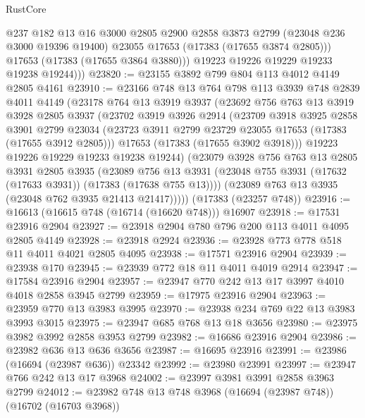 \begin{lexlean}{RustCore}
\begin{coremodule}
              @237
              @182
              @13
              @16
              @3000
              @2805
              @2900
              @2858
              @3873
              @2799
              (@23048 @236 @3000 @19396 @19400)
              @23055
              @17653
              (@17383 (@17655 @3874 @2805)))
            @17653
            (@17383 (@17655 @3864 @3880)))
          @19223
          @19226
          @19229
          @19233
          @19238
          @19244)))
@23820 := @23155 @3892 @799 @804 @113 @4012 @4149 @2805 @4161
@23910 := @23166
    @748
    @13
    @764
    @798
    @113
    @3939
    @748
    @2839
    @4011
    @4149
    (@23178
      @764
      @13
      @3919
      @3937
      (@23692
        @756
        @763
        @13
        @3919
        @3928
        @2805
        @3937
        (@23702
          @3919
          @3926
          @2914
          (@23709
            @3918
            @3925
            @2858
            @3901
            @2799
            @23034
            (@23723 @3911 @2799 @23729 @23055 @17653 (@17383 (@17655 @3912 @2805)))
            @17653
            (@17383 (@17655 @3902 @3918)))
          @19223
          @19226
          @19229
          @19233
          @19238
          @19244)
        (@23079
          @3928
          @756
          @763
          @13
          @2805
          @3931
          @2805
          @3935
          (@23089
            @756
            @13
            @3931
            (@23048 @755 @3931 (@17632 (@17633 @3931)) (@17383 (@17638 @755 @13))))
          (@23089 @763 @13 @3935 (@23048 @762 @3935 @21413 @21417)))))
    (@17383 (@23257 @748))
@23916 := @16613 (@16615 @748 (@16714 (@16620 @748))) @16907
@23918 := @17531 @23916 @2904
@23927 := @23918 @2904 @780 @796 @200 @113 @4011 @4095 @2805 @4149
@23928 := @23918 @2924
@23936 := @23928 @773 @778 @518 @11 @4011 @4021 @2805 @4095
@23938 := @17571 @23916 @2904
@23939 := @23938 @170
@23945 := @23939 @772 @18 @11 @4011 @4019 @2914
@23947 := @17584 @23916 @2904
@23957 := @23947 @770 @242 @13 @17 @3997 @4010 @4018 @2858 @3945 @2799
@23959 := @17975 @23916 @2904
@23963 := @23959 @770 @13 @3983 @3995
@23970 := @23938 @234 @769 @22 @13 @3983 @3993 @3015
@23975 := @23947 @685 @768 @13 @18 @3656
@23980 := @23975 @3982 @3992 @2858 @3953 @2799
@23982 := @16686 @23916 @2904
@23986 := @23982 @636 @13 @636 @3656
@23987 := @16695 @23916
@23991 := @23986 (@16694 (@23987 @636)) @23342
@23992 := @23980 @23991
@23997 := @23947 @766 @242 @13 @17 @3968
@24002 := @23997 @3981 @3991 @2858 @3963 @2799
@24012 := @23982 @748 @13 @748 @3968 (@16694 (@23987 @748)) (@16702 (@16703 @3968))

\end{coremodule}
\end{lexlean}
